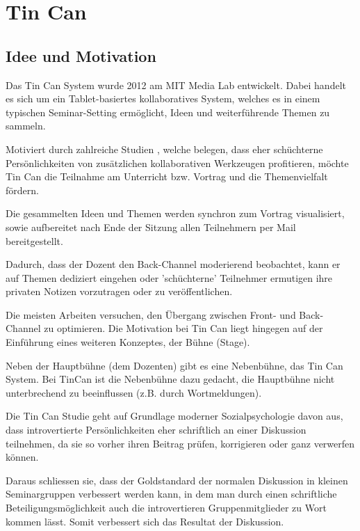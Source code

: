\section{Tin Can}

\subsection{Idee und Motivation}
Das Tin Can System \cite{HarGorSch2012} wurde 2012 am MIT Media Lab entwickelt.
Dabei handelt es sich um ein Tablet-basiertes kollaboratives System, welches es
in einem typischen Seminar-Setting ermöglicht, Ideen und wei\-ter\-führ\-en\-de
Themen zu sammeln.

Motiviert durch zahlreiche Studien \cite{HarGorSch2012}\cite{KimChaHolPent2008}\cite{BergKara2009-1}\cite{BergKara2009-2}, welche belegen, dass eher schüchterne
Persönlichkeiten von zu\-sätz\-lich\-en kollaborativen Werkzeugen profitieren,
möchte Tin Can die Teilnahme am Unterricht bzw. Vortrag und die Themenvielfalt fördern.

Die gesammelten Ideen und Themen werden synchron zum Vortrag visualisiert, sowie
aufbereitet nach Ende der Sitzung allen Teilnehmern per Mail bereitgestellt.

Dadurch, dass der Dozent den Back-Channel moderierend beobachtet, kann er auf
Themen dediziert eingehen oder 'schüchterne' Teilnehmer ermutigen ihre privaten
Notizen vorzutragen oder zu veröffentlichen.

Die meisten Arbeiten versuchen, den Übergang zwischen Front- und Back-Channel zu
optimieren. Die Motivation bei Tin Can liegt hingegen auf der Einführung eines
weiteren Konzeptes, der Bühne (Stage).

Neben der Hauptbühne (dem Dozenten) gibt es eine Nebenbühne, das Tin Can System.
Bei TinCan ist die Nebenbühne dazu gedacht, die Hauptbühne nicht unterbrechend zu
beeinflussen (z.B. durch Wortmeldungen).

Die Tin Can Studie geht auf Grundlage moderner Sozialpsychologie davon aus, dass
introvertierte Persönlichkeiten eher schriftlich an einer Diskussion teilnehmen,
da sie so vorher ihren Beitrag prüfen, korrigieren oder ganz verwerfen können.

Daraus schliessen sie, dass der Goldstandard der normalen Diskussion in
kleinen Seminargruppen verbessert werden kann, in dem man durch einen
schriftliche Beteiligungsmöglichkeit auch die introvertieren Gruppenmitglieder
zu Wort kommen lässt. Somit verbessert sich das Resultat der Diskussion.

